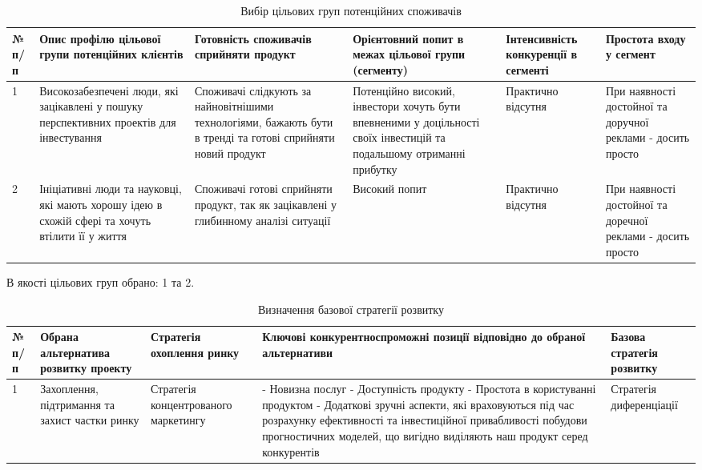 \begin{table}[h!]
\fontsize{12pt}{12pt}\selectfont
	\begin{tabularx}{\textwidth}{|l|X|X|X|X|X|}
    \hline
    № п/п & Опис профілю цільової групи потенційних клієнтів & Готовність споживачів сприйняти продукт & Орієнтовний попит в межах цільової групи (сегменту) & Інтенсивність конкуренції в сегменті & Простота входу у сегмент \\ \hline
    1 & Високозабезпечені люди, які зацікавлені у пошуку перспективних проектів для інвестування & Споживачі слідкують за найновітнішими технологіями, бажають бути в тренді та готові сприйняти новий продукт & Потенційно високий, інвестори хочуть бути впевненими у доцільності своїх інвестицій та подальшому отриманні прибутку & Практично відсутня & При наявності достойної та доручної реклами - досить просто \\ \hline
    2 & Ініціативні люди та науковці, які мають хорошу ідею в схожій сфері та хочуть втілити її у життя & Споживачі готові сприйняти продукт, так як зацікавлені у глибинному аналізі ситуації & Високий попит & Практично відсутня & При наявності достойної та доречної реклами - досить просто \\
    \hline
    \end{tabularx}
\caption{Вибір цільових груп потенційних споживачів} \label{tab:stab_10}
\end{table}
В якості цільових груп обрано: 1 та 2.

\begin{table}[h!]
\fontsize{12pt}{12pt}\selectfont
	\begin{tabularx}{\textwidth}{|l|X|X|X|X|}
    \hline
    № п/п & Обрана альтернатива розвитку проекту & Стратегія охоплення ринку & Ключові конкурентноспроможні позиції відповідно до обраної альтернативи & Базова стратегія розвитку \\ \hline
    1 & Захоплення, підтримання та захист частки ринку & Стратегія концентрованого маркетингу & - Новизна послуг
    - Доступність продукту
    - Простота в користуванні продуктом
    - Додаткові зручні аспекти, які враховуються під час розрахунку ефективності та інвестиційної привабливості побудови прогностичних моделей, що вигідно виділяють наш продукт серед конкурентів & Стратегія диференціації \\
    \hline
    \end{tabularx}
\caption{Визначення базової стратегії розвитку} \label{tab:stab_11}
\end{table}


